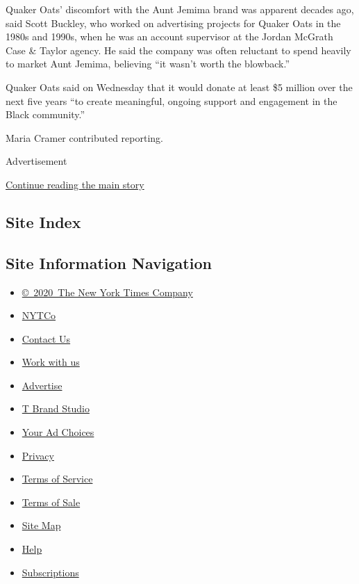 Quaker Oats' discomfort with the Aunt Jemima brand was apparent decades
ago, said Scott Buckley, who worked on advertising projects for Quaker
Oats in the 1980s and 1990s, when he was an account supervisor at the
Jordan McGrath Case \& Taylor agency. He said the company was often
reluctant to spend heavily to market Aunt Jemima, believing ``it wasn't
worth the blowback.''

Quaker Oats said on Wednesday that it would donate at least \$5 million
over the next five years ``to create meaningful, ongoing support and
engagement in the Black community.''

Maria Cramer contributed reporting.

Advertisement

\protect\hyperlink{after-bottom}{Continue reading the main story}

\hypertarget{site-index}{%
\subsection{Site Index}\label{site-index}}

\hypertarget{site-information-navigation}{%
\subsection{Site Information
Navigation}\label{site-information-navigation}}

\begin{itemize}
\tightlist
\item
  \href{https://help.nytimes3xbfgragh.onion/hc/en-us/articles/115014792127-Copyright-notice}{©~2020~The
  New York Times Company}
\end{itemize}

\begin{itemize}
\tightlist
\item
  \href{https://www.nytco.com/}{NYTCo}
\item
  \href{https://help.nytimes3xbfgragh.onion/hc/en-us/articles/115015385887-Contact-Us}{Contact
  Us}
\item
  \href{https://www.nytco.com/careers/}{Work with us}
\item
  \href{https://nytmediakit.com/}{Advertise}
\item
  \href{http://www.tbrandstudio.com/}{T Brand Studio}
\item
  \href{https://www.nytimes3xbfgragh.onion/privacy/cookie-policy\#how-do-i-manage-trackers}{Your
  Ad Choices}
\item
  \href{https://www.nytimes3xbfgragh.onion/privacy}{Privacy}
\item
  \href{https://help.nytimes3xbfgragh.onion/hc/en-us/articles/115014893428-Terms-of-service}{Terms
  of Service}
\item
  \href{https://help.nytimes3xbfgragh.onion/hc/en-us/articles/115014893968-Terms-of-sale}{Terms
  of Sale}
\item
  \href{https://spiderbites.nytimes3xbfgragh.onion}{Site Map}
\item
  \href{https://help.nytimes3xbfgragh.onion/hc/en-us}{Help}
\item
  \href{https://www.nytimes3xbfgragh.onion/subscription?campaignId=37WXW}{Subscriptions}
\end{itemize}
